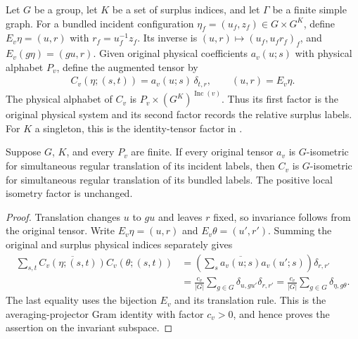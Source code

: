 
\begin{definition}%
    \label{def:peps_regular_graph_surplus_site}
    \leanok
    Let $G$ be a group, let $K$ be a set of surplus indices, and let
    $\Gamma$ be a finite simple graph. For a bundled incident configuration
    $\eta_f=(u_f,z_f)\in G\times G^K$, define
    $E_v\eta=(u,r)$ with $r_f=u_f^{-1}z_f$. Its inverse is
    $(u,r)\mapsto(u_f,u_fr_f)_f$, and
    $E_v(g\eta)=(gu,r)$.
    Given original physical coefficients $a_v(u;s)$ with physical alphabet
    $P_v$, define the augmented tensor by
    \begin{align}
        C_v(\eta;(s,t))=a_v(u;s)\,\delta_{t,r},
        \qquad (u,r)=E_v\eta.
    \end{align}
    The physical alphabet of $C_v$ is $P_v\times(G^K)^{\operatorname{Inc}(v)}$.
    Thus its first factor is the original physical system and its second
    factor records the relative surplus labels. For $K$ a singleton, this
    is the identity-tensor factor in
    \cite[Observation~6.6]{Schuch2010PEPS}.
\end{definition}

\begin{lemma}%
    \label{thm:peps_regular_graph_surplus_isometry}
    \leanok
    Suppose $G$, $K$, and every $P_v$ are finite. If every original tensor
    $a_v$ is $G$-isometric for simultaneous regular translation of its
    incident labels, then $C_v$ is $G$-isometric for simultaneous regular
    translation of its bundled labels. The positive local isometry factor
    is unchanged.
\end{lemma}

\begin{proof}\leanok
    Translation changes $u$ to $gu$ and leaves $r$ fixed, so invariance
    follows from the original tensor. Write $E_v\eta=(u,r)$ and
    $E_v\theta=(u',r')$. Summing the original and surplus physical indices
    separately gives
    \begin{align}
        \sum_{s,t}\overline{C_v(\eta;(s,t))}C_v(\theta;(s,t))
         & =\left(\sum_s\overline{a_v(u;s)}a_v(u';s)\right)
        \delta_{r,r'}                                       \\
         & =\frac{c_v}{|G|}\sum_{g\in G}
        \delta_{u,gu'}\delta_{r,r'}
        =\frac{c_v}{|G|}\sum_{g\in G}\delta_{\eta,g\theta}.
    \end{align}
    The last equality uses the bijection $E_v$ and its translation rule.
    This is the averaging-projector Gram identity with factor $c_v>0$,
    and hence proves the assertion on the invariant subspace.
\end{proof}

